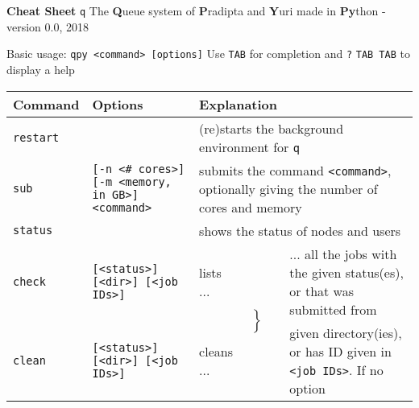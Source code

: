 \documentclass[a4paper,11pt]{article}
\newcommand{\qpy}{{\texttt{q}\raisebox{-0.45ex}{\textit{py}}}}
\begin{document}
\begin{landscape}

  \colorbox{RC2}{\textbf{\Huge Cheat Sheet}} \: {\Huge \qpy{}} \: The \textbf{Q}ueue system of \textbf{P}radipta and \textbf{Y}uri made in \textbf{Py}thon - version 0.0, 2018\vspace{0.0cm}

  \begin{center}
    \colorbox{RC2}{Basic usage:} {\texttt{qpy <command> [options]}} \colorbox{RC1}{Use \texttt{TAB} for completion and \texttt{?} \texttt{TAB TAB} to display a help}
  \end{center}\vspace{0.0cm}
  
  \begin{minipage}{1.0\textheight}
    \begin{tabular}{lllll}
      \hline
      \rowcolor{RC2}
      Command            & Options & \multicolumn{3}{l}{Explanation} \\
      \hline
      \texttt{restart}   &
                                   & \multicolumn{3}{l}{(re)starts the background environment for \qpy{}} \\
      \rowcolor{RC1}
      \texttt{sub}       & \texttt{[-n <\# cores>]} \texttt{[-m <memory, in GB>]} \texttt{<command>}
                                   & \multicolumn{3}{l}{submits the command \texttt{<command>}, optionally giving the number of cores and memory}\\
      \texttt{status}    &
                                   & \multicolumn{3}{l}{shows the status of nodes and users}\\
      \cellcolor{RC1}\texttt{check} & \cellcolor{RC1}\texttt{[<status>] [<dir>] [<job IDs>]}
                                   & \cellcolor{RC1}lists ... & \multirow{3}{0.3cm}{$\left\}\begin{array}{l} \\ \\ \\ \end{array}\right.$}
                                   & \cellcolor{RC1}... all the jobs with the given status(es), or that was submitted from\\
      \texttt{clean}     & \texttt{[<status>] [<dir>] [<job IDs>]}
                                   & cleans ... &
                                   & \cellcolor{RC1}given directory(ies), or has ID given in \texttt{<job IDs>}. If no option\\

\end{tabular}
\end{minipage}
\end{landscape}
\end{document}
